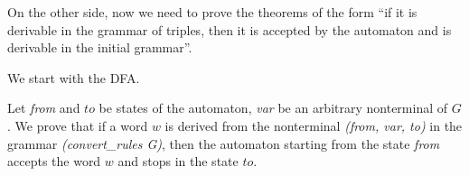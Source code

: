 %
%

On the other side, now we need to prove the theorems of the form  ``if it is derivable in the grammar of triples, then it is accepted by the automaton and is derivable in the initial grammar''.

We start with the DFA.

\begin{theorem}
	Let \textit{from} and $to$ be states of the automaton, \textit{var} be an arbitrary nonterminal of $G$. We prove that if a word $w$ is derived from the nonterminal \textit{(from, var, to)} in the grammar \textit{(convert\_rules G)}, then the automaton starting from the state \textit{from} accepts the word $w$ and stops in the state $to$.
\end{theorem}

